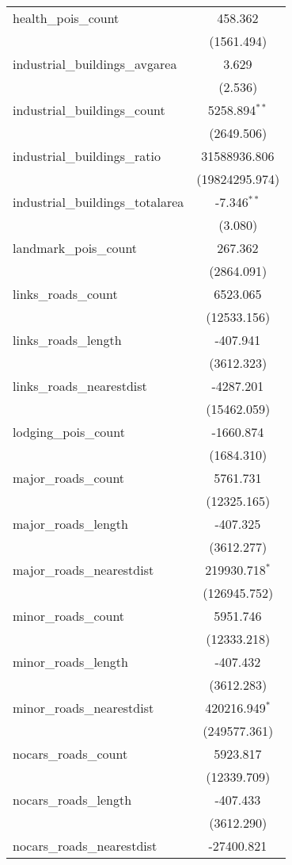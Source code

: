 \begin{table}[!htbp]
\begin{tabular}{@{\extracolsep{5pt}}lc}
 health_pois_count & 458.362$^{}$ \\
  & (1561.494) \\
 industrial_buildings_avgarea & 3.629$^{}$ \\
  & (2.536) \\
 industrial_buildings_count & 5258.894$^{**}$ \\
  & (2649.506) \\
 industrial_buildings_ratio & 31588936.806$^{}$ \\
  & (19824295.974) \\
 industrial_buildings_totalarea & -7.346$^{**}$ \\
  & (3.080) \\
 landmark_pois_count & 267.362$^{}$ \\
  & (2864.091) \\
 links_roads_count & 6523.065$^{}$ \\
  & (12533.156) \\
 links_roads_length & -407.941$^{}$ \\
  & (3612.323) \\
 links_roads_nearestdist & -4287.201$^{}$ \\
  & (15462.059) \\
 lodging_pois_count & -1660.874$^{}$ \\
  & (1684.310) \\
 major_roads_count & 5761.731$^{}$ \\
  & (12325.165) \\
 major_roads_length & -407.325$^{}$ \\
  & (3612.277) \\
 major_roads_nearestdist & 219930.718$^{*}$ \\
  & (126945.752) \\
 minor_roads_count & 5951.746$^{}$ \\
  & (12333.218) \\
 minor_roads_length & -407.432$^{}$ \\
  & (3612.283) \\
 minor_roads_nearestdist & 420216.949$^{*}$ \\
  & (249577.361) \\
 nocars_roads_count & 5923.817$^{}$ \\
  & (12339.709) \\
 nocars_roads_length & -407.433$^{}$ \\
  & (3612.290) \\
 nocars_roads_nearestdist & -27400.821$^{}$ \\

\end{tabular}
\end{table}
